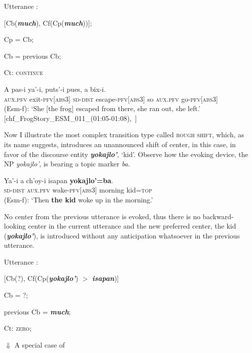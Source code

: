 \documentclass[output=paper
,modfonts
,nonflat]{langsci/langscibook}
\begin{document}
\ea
Utterance :

[Cb(\textbf{\textit{much}}), Cf(Cp(\textbf{\textit{much}}))];

Cp = Cb;

Cb = previous Cb;

Ct: \textsc{continue}
\z



\ea \label{ex:pico:19}

\gll   A pas-i ya'-i, puts'-i  pues, a bix-i.\\
{\textsc{aux.pfv}} exit-{\textsc{pfv[abs3]}} {\textsc{sd-dist}} escape-{\textsc{pfv[abs3]}} so {\textsc{aux.pfv}} go-{\textsc{pfv[abs3]}}\\

\glt (Esm-f): `She [the frog] escaped from there, she ran out, she left.' [chf\_FrogStory\_ESM\_011\_(01:05-01:08),~\citealt{Delgado-Galvan2018archive}]
\z


Now I illustrate the most complex transition type called \textsc{rough shift}, which, as its name suggests, introduces an unannounced shift of center, in this case, in favor of the discourse entity \textbf{\textit{yokajlo'}}, `kid'. Observe how the evoking device, the NP \textit{yokajlo'}, is bearing a topic marker \textit{ba}.

\ea \label{ex:pico:15}

\gll   Ya'-i a ch'oy-i isapan \textbf{yokajlo'=ba}.\\
{\textsc{sd-dist}} {\textsc{aux.pfv}} wake-{\textsc{pfv[abs3]}} morning kid={\textsc{top}}\\
\glt (Esm-f): `Then \textbf{the kid} woke up in the morning.'
\z

No center from the previous utterance is evoked, thus there is no backward-looking center in the current utterance and the new preferred center, the kid (\textbf{\textit{yokajlo'}}), is introduced without any anticipation whatsoever in the previous utterance.

\ea
Utterance :

[Cb(?), Cf(Cp(\textbf{\textit{yokajlo'}}) $>$ \textbf{\textit{isapan}})]

Cb = ?;

previous Cb = \textbf{\textit{much}};

Ct: \textsc{zero}; 



$\Downarrow$ A special case of
\end{document}

